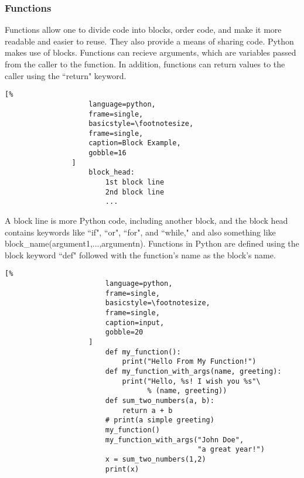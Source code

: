 \documentclass[crop=false,class=book,oneside]{standalone}
\begin{document}
            \subsubsection{Functions}
                Functions allow one to divide code into blocks, order
                code, and make it more readable and easier to reuse. They
                also provide a means of sharing code. Python makes use of
                blocks. Functions can recieve arguments, which are
                variables passed from the caller to the function. In
                addition, functions can return values to the caller using
                the ``return" keyword.
                \begin{lstlisting}[%
                    language=python,
                    frame=single,
                    basicstyle=\footnotesize,
                    frame=single,
                    caption=Block Example,
                    gobble=16
                ]
                    block_head:
                        1st block line
                        2nd block line
                        ...
                \end{lstlisting}
                A block line is more Python code, including another
                block, and the block head contains keywords like ``if",
                ``or", ``for", and ``while," and also something like
                block\_name(argument1,...,argumentn). Functions in Python
                are defined using the block keyword ``def" followed with
                the function's name as the block's name.\newline
                \begin{minipage}[t]{.48\textwidth}
                    \centering
                    \begin{lstlisting}[%
                        language=python,
                        frame=single,
                        basicstyle=\footnotesize,
                        frame=single,
                        caption=input,
                        gobble=20
                    ]
                        def my_function():
                            print("Hello From My Function!")
                        def my_function_with_args(name, greeting):
                            print("Hello, %s! I wish you %s"\
                                  % (name, greeting))
                        def sum_two_numbers(a, b):
                            return a + b
                        # print(a simple greeting)
                        my_function()
                        my_function_with_args("John Doe",
                                              "a great year!")
                        x = sum_two_numbers(1,2)
                        print(x)
                    \end{lstlisting}
                \end{minipage}\hfill
\end{document}
